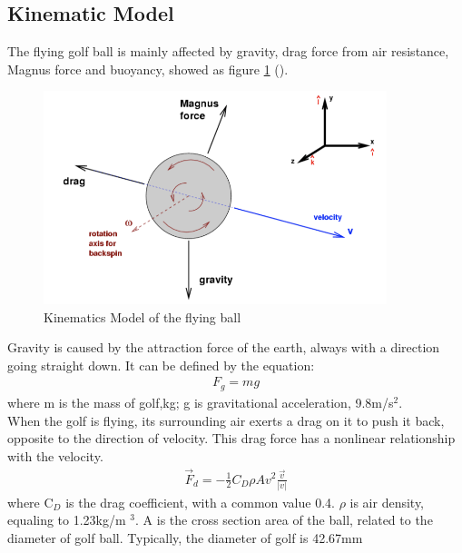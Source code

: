 \subsection{Kinematic Model}
The flying golf ball is mainly affected by gravity, drag force from air resistance, Magnus force and buoyancy, showed as figure \ref{fig:model} (\cite{KinematicModel}). 
\begin{figure}[H]
    \centering
    \includegraphics[width=10cm]{figure/force.png}
    \caption{Kinematics Model of the flying ball}
    \label{fig:model}
\end{figure}
Gravity is caused by the attraction force of the earth, always with a direction going straight down. It can be defined by the equation:
\begin{align}
F_{g}=m g
\end{align}
where m is the mass of golf,kg; g is gravitational acceleration, 9.8m/s$^2$.\\

When the golf is flying, its surrounding air exerts a drag on it to push it back, opposite to the direction of velocity. This drag force has a nonlinear relationship with the velocity.
\begin{align}
\vec{F}_{d}=-\frac{1}{2} C_{D} \rho A v^{2} \frac{\vec{v}}{|v|}
\end{align}
where C$_D$ is the drag coefficient, with a common value 0.4. $\rho$ is air density, equaling to 1.23kg/m $^3$. A is the cross section area of the ball, related to the diameter of golf ball. Typically, the diameter of golf is 42.67mm\\

